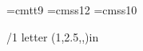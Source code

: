 


\font\ninett=cmtt9
\font\secfont=cmss12 %
\font\subsecfont=cmss10

\def\StarbuckGreen{\setcmykcolor{1.0 0 0.5 0.6}}

\fixmnotes\right \mnotesize=1.7in \def\mnotehook{\typosize[8/10]\it}
\mnoteindent=20pt
\margins/1 letter (1,2.5,,)in

\hyperlinks \Green \Blue %

\def\tthook{\typosize[9/11]}  %

%
\def\symbol{\begingroup\catcode`\_=12\relax\symbolimpl}
\def\symbolimpl#1{{\ninett #1}\endgroup}

%
\def\sec#1{\vskip15pt
\noindent{\llap{\raise0.95pt\hbox{$\blacktriangleright$ }}\secfont{}#1}\hfill\vskip 5pt
  \everypar={{\setbox0\lastbox}\everypar={}}}

\def\subsec#1{\vskip10pt \noindent{\underbar{\subsecfont{}#1}}\hfill\vskip 5pt
  \everypar={{\setbox0\lastbox}\everypar={}}}

